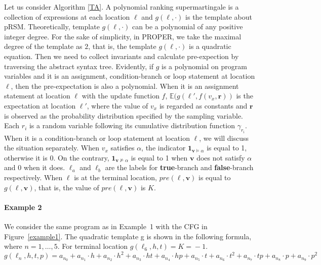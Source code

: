 \documentclass[runningheads]{llncs}
\newcommand\yx[1]{{\color{red} [YD: #1]}}
\begin{document}
Let us consider Algorithm \ref{TA}. A polynomial ranking supermartingale is a collection of expressions at each location $\ell$ and $g(\ell,\cdot)$ is the template about pRSM. Theoretically, template $g(\ell,\cdot)$ can be a polynomial of any positive integer  degree. For the sake of simplicity, in PROPER, we take the maximal degree of the template as $2$, that is, the template $g(\ell,\cdot)$ is a quadratic equation.
Then we need to collect invariants and calculate pre-expection by traversing the abstract syntax tree. Evidently, if $g$ is a polynomial on program variables and it is an assignment, condition-branch or loop statement at location $\ell$, then the pre-expectation is also a polynomial. When it is an assignment statement at location $\ell$ with the update function $f$, $\mathbb{E}(g(\ell',f(v_x,\boldsymbol{r}))$ is the expectation at location $\ell'$, where the value of $v_x$ is regarded as constants and $\boldsymbol{r}$ is observed as the probability distribution specified by the sampling variable. Each $r_i$ is a random variable following its cumulative distribution function $\gamma_{r_i}$.
When it is a condition-branch or loop statement at location $\ell$, we will discuss the situation separately. When $v_x$ satisfies $\alpha$, the indicator $\textbf{1}_{\boldsymbol{v}\vDash\alpha}$ is equal to 1, otherwise it is 0. On the contrary, $\textbf{1}_{\boldsymbol{v}\nvDash\alpha}$ is equal to 1 when $\boldsymbol{v}$ does not satisfy $\alpha$ and 0 when it does. $\ell_a$ and $\ell_b$ are the labels for \textbf{true}-branch and \textbf{false}-branch respectively. When $\ell$ is at the terminal location,  $pre(\ell,\boldsymbol{v})$ is equal to $g(\ell,\boldsymbol{v})$, that is, the value of $pre(\ell,\boldsymbol{v})$ is $K$.

\paragraph{Example 2} 
We consider the same program as in Example~1 with the CFG in Figure~\ref{example1}. The quadratic template g is shown in the following formula, where $n=1,\ldots,5$. For terminal location $g(\ell_6,h,t)\!=\!K\!=\!-1$. 
$$g(\!\ell_n,h,t,p\!)\!=\!a_{n_0}\!+\!a_{n_1}\cdot h\!+\!a_{n_2}\cdot h^{2}\!+\!a_{n_3}\cdot ht \!+\!a_{n_4}\cdot hp\!+\!a_{n_5}\cdot t\!+\!a_{n_6}\cdot t^{2}+\!a_{n_7}\cdot tp\!+\!a_{n_8}\cdot p\!+\!a_{n_9}\cdot p^{2}$$ 
\end{document}
